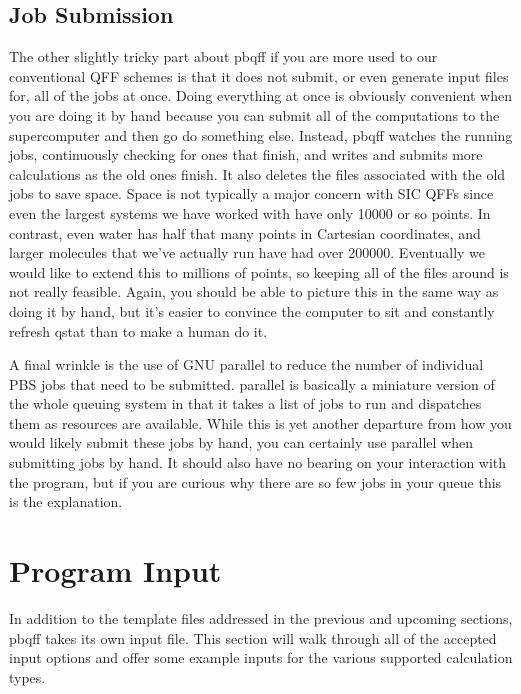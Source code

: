 \documentclass{article}
\begin{document}
\subsection{Job Submission}

The other slightly tricky part about pbqff if you are more used to our
conventional QFF schemes is that it does not submit, or even generate
input files for, all of the jobs at once. Doing everything at once is
obviously convenient when you are doing it by hand because you can
submit all of the computations to the supercomputer and then go do
something else. Instead, pbqff watches the running jobs, continuously
checking for ones that finish, and writes and submits more
calculations as the old ones finish. It also deletes the files
associated with the old jobs to save space. Space is not typically a
major concern with SIC QFFs since even the largest systems we have
worked with have only 10000 or so points. In contrast, even water has
half that many points in Cartesian coordinates, and larger molecules
that we've actually run have had over 200000. Eventually we would like
to extend this to millions of points, so keeping all of the files
around is not really feasible. Again, you should be able to picture
this in the same way as doing it by hand, but it's easier to convince
the computer to sit and constantly refresh qstat than to make a human
do it.

A final wrinkle is the use of GNU parallel to reduce the number of
individual PBS jobs that need to be submitted. parallel is basically a
miniature version of the whole queuing system in that it takes a list
of jobs to run and dispatches them as resources are available. While
this is yet another departure from how you would likely submit these
jobs by hand, you can certainly use parallel when submitting jobs by
hand. It should also have no bearing on your interaction with the
program, but if you are curious why there are so few jobs in your
queue this is the explanation.

\section{Program Input}

In addition to the template files addressed in the previous and
upcoming sections, pbqff takes its own input file. This section will
walk through all of the accepted input options and offer some example
inputs for the various supported calculation types.
\end{document}

